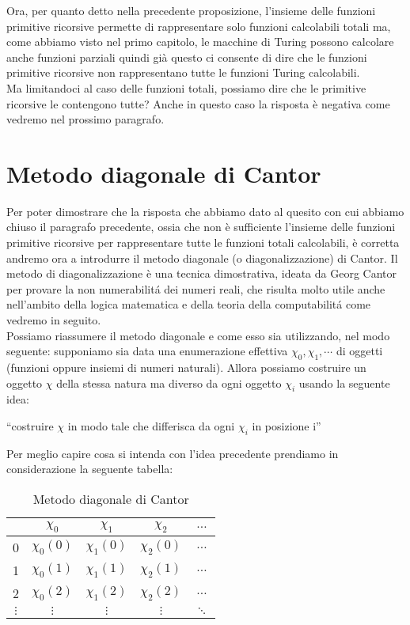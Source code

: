 Ora, per quanto detto nella precedente proposizione, l'insieme delle funzioni
primitive ricorsive permette di rappresentare solo funzioni calcolabili totali
ma, come abbiamo visto nel primo capitolo, le macchine di Turing possono
calcolare anche funzioni parziali quindi gi\`a questo ci consente di dire che le
funzioni primitive ricorsive non rappresentano tutte le funzioni Turing
calcolabili.\\ 
Ma limitandoci al caso delle funzioni totali, possiamo dire che le primitive
ricorsive le contengono tutte? Anche in questo caso la risposta \`e negativa
come vedremo nel prossimo paragrafo.

\section{Metodo diagonale di Cantor}
Per poter dimostrare che la risposta che abbiamo dato al quesito con cui abbiamo
chiuso il paragrafo precedente, ossia che non \`e sufficiente l'insieme delle
funzioni primitive ricorsive per rappresentare tutte le funzioni totali
calcolabili, \`e corretta andremo ora a introdurre il metodo diagonale (o
diagonalizzazione) di Cantor.
Il metodo di diagonalizzazione \`e una tecnica dimostrativa, ideata da Georg
Cantor per provare la non numerabilit\'a dei numeri reali, che risulta molto
utile anche nell'ambito della logica matematica e della teoria della
computabilit\'a come vedremo in seguito.\\
Possiamo riassumere il metodo diagonale e come esso sia utilizzando, nel modo
seguente: supponiamo sia data una enumerazione effettiva
$\chi_{0},\chi_{1},\cdots$ di oggetti (funzioni oppure insiemi di numeri
naturali). Allora possiamo costruire un oggetto $\chi$ della stessa natura ma
diverso da ogni oggetto $\chi_{i}$ usando la seguente idea:
\begin{center}
``costruire $\chi$ in modo tale che differisca da ogni $\chi_{i}$ in posizione
i''
\end{center}
Per meglio capire cosa si intenda con l'idea precedente prendiamo in
considerazione la seguente tabella:\\
\begin{table}[!ht]
\begin{center}
\begin{tabular}{|c|c|c|c|c}

\hline
 & $\chi_0$ & $\chi_1$ & $\chi_2$ & $\ldots$\\
\hline
0 & $\chi_0(0)$ & $\chi_1(0)$  & $\chi_2(0)$  & $\ldots$\\
\hline
1 & $\chi_0(1)$ & $\chi_1(1)$  & $\chi_2(1)$  & $\ldots$\\
\hline
2 &  $\chi_0(2)$ & $\chi_1(2)$  & $\chi_2(2)$  & $\ldots$\\
\hline
$\vdots$ & $\vdots$ &       $\vdots$  & $\vdots$  & $\ddots$\\

\end{tabular}
\end{center}
\caption{Metodo diagonale di Cantor}
\end{table}
